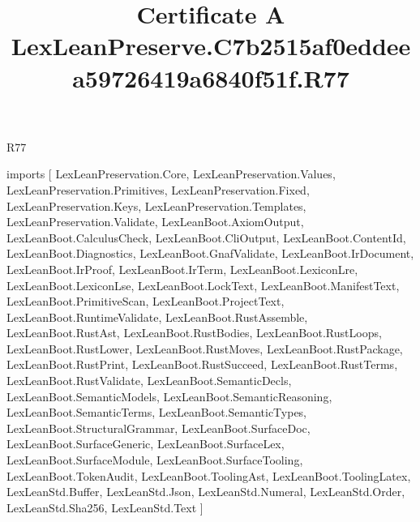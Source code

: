 \begin{lexlean}{R77}
\title{Certificate A LexLeanPreserve.C7b2515af0eddeea59726419a6840f51f.R77}
\begin{coremodule}
imports [
  LexLeanPreservation.Core,
  LexLeanPreservation.Values,
  LexLeanPreservation.Primitives,
  LexLeanPreservation.Fixed,
  LexLeanPreservation.Keys,
  LexLeanPreservation.Templates,
  LexLeanPreservation.Validate,
  LexLeanBoot.AxiomOutput,
  LexLeanBoot.CalculusCheck,
  LexLeanBoot.CliOutput,
  LexLeanBoot.ContentId,
  LexLeanBoot.Diagnostics,
  LexLeanBoot.GnafValidate,
  LexLeanBoot.IrDocument,
  LexLeanBoot.IrProof,
  LexLeanBoot.IrTerm,
  LexLeanBoot.LexiconLre,
  LexLeanBoot.LexiconLse,
  LexLeanBoot.LockText,
  LexLeanBoot.ManifestText,
  LexLeanBoot.PrimitiveScan,
  LexLeanBoot.ProjectText,
  LexLeanBoot.RuntimeValidate,
  LexLeanBoot.RustAssemble,
  LexLeanBoot.RustAst,
  LexLeanBoot.RustBodies,
  LexLeanBoot.RustLoops,
  LexLeanBoot.RustLower,
  LexLeanBoot.RustMoves,
  LexLeanBoot.RustPackage,
  LexLeanBoot.RustPrint,
  LexLeanBoot.RustSucceed,
  LexLeanBoot.RustTerms,
  LexLeanBoot.RustValidate,
  LexLeanBoot.SemanticDecls,
  LexLeanBoot.SemanticModels,
  LexLeanBoot.SemanticReasoning,
  LexLeanBoot.SemanticTerms,
  LexLeanBoot.SemanticTypes,
  LexLeanBoot.StructuralGrammar,
  LexLeanBoot.SurfaceDoc,
  LexLeanBoot.SurfaceGeneric,
  LexLeanBoot.SurfaceLex,
  LexLeanBoot.SurfaceModule,
  LexLeanBoot.SurfaceTooling,
  LexLeanBoot.TokenAudit,
  LexLeanBoot.ToolingAst,
  LexLeanBoot.ToolingLatex,
  LexLeanStd.Buffer,
  LexLeanStd.Json,
  LexLeanStd.Numeral,
  LexLeanStd.Order,
  LexLeanStd.Sha256,
  LexLeanStd.Text
]


\end{coremodule}
\end{lexlean}
